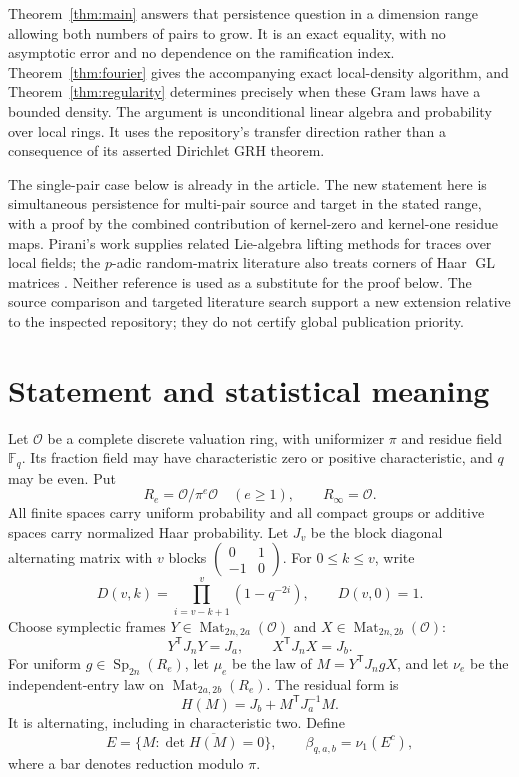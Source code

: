 \documentclass[11pt]{article}
\theoremstyle{remark}
\newcommand{\OO}{\mathcal O}
\newcommand{\FF}{\mathbb F}
\newcommand{\Mat}{\operatorname{Mat}}
\newcommand{\Sp}{\operatorname{Sp}}
\newcommand{\GL}{\operatorname{GL}}
\newcommand{\trans}{\mathsf T}
\begin{document}
Theorem~\ref{thm:main} answers that persistence question in a dimension range
allowing both numbers of pairs to grow. It is an exact equality, with no
asymptotic error and no dependence on the ramification index.
Theorem~\ref{thm:fourier} gives the accompanying exact local-density algorithm,
and Theorem~\ref{thm:regularity} determines precisely when these Gram laws
have a bounded density.
The argument is unconditional linear algebra and probability over local
rings. It uses the repository's transfer direction rather than a consequence
of its asserted Dirichlet GRH theorem.

The single-pair case below is already in the article. The new statement here
is simultaneous persistence for multi-pair source and target in the stated
range, with a proof by the combined contribution of kernel-zero and
kernel-one residue maps. Pirani's work \cite{Pirani} supplies related
Lie-algebra lifting methods for traces over local fields; the \(p\)-adic
random-matrix literature also treats corners of Haar \(\GL\) matrices
\cite{VanPeski}. Neither reference is used as a substitute for the proof
below. The source comparison and targeted literature search support a new
extension relative to the inspected repository; they do not certify global
publication priority.

\section{Statement and statistical meaning}

Let \(\OO\) be a complete discrete valuation ring, with uniformizer \(\pi\)
and residue field \(\FF_q\). Its fraction field may have characteristic zero
or positive characteristic, and \(q\) may be even. Put
\[
 R_e=\OO/\pi^e\OO\quad(e\ge1),\qquad R_\infty=\OO.
\]
All finite spaces carry uniform probability and all compact groups or additive
spaces carry normalized Haar probability. Let \(J_v\) be the block diagonal
alternating matrix with \(v\) blocks
\(\left(\begin{smallmatrix}0&1\\-1&0\end{smallmatrix}\right)\).
For \(0\le k\le v\), write
\[
 D(v,k)=\prod_{i=v-k+1}^{v}(1-q^{-2i}),\qquad D(v,0)=1.
\]
Choose symplectic frames \(Y\in\Mat_{2n,2a}(\OO)\) and
\(X\in\Mat_{2n,2b}(\OO)\):
\[
 Y^\trans J_nY=J_a,\qquad X^\trans J_nX=J_b.
\]
For uniform \(g\in\Sp_{2n}(R_e)\), let \(\mu_e\) be the law of
\(M=Y^\trans J_ngX\), and let \(\nu_e\) be the independent-entry law on
\(\Mat_{2a,2b}(R_e)\). The residual form is
\[
 H(M)=J_b+M^\trans J_a^{-1}M.
 \tag{2.1}\label{eq:residual}
\]
It is alternating, including in characteristic two. Define
\[
 E=\{M:\det\overline{H(M)}=0\},\qquad
 \beta_{q,a,b}=\nu_1(E^c),
 \tag{2.2}\label{eq:event}
\]
where a bar denotes reduction modulo \(\pi\).
\end{document}
